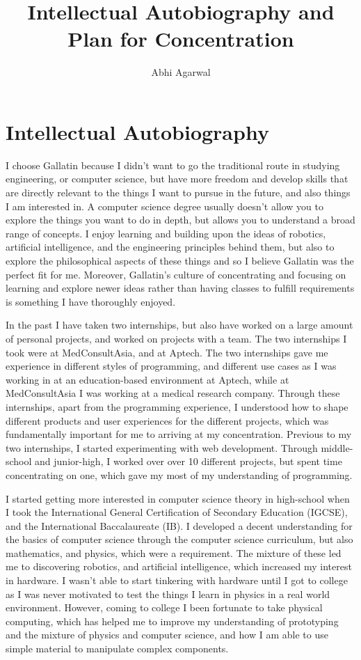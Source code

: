 \documentclass[11pt, oneside]{article}
\title{Intellectual Autobiography and Plan for Concentration}
\author{Abhi Agarwal}
\date{}
\begin{document}
\maketitle
\section{Intellectual Autobiography}

\par I choose Gallatin because I didn't want to go the traditional route in studying engineering, or computer science, but have more freedom and develop skills that are directly relevant to the things I want to pursue in the future, and also things I am interested in. A computer science degree usually doesn't allow you to explore the things you want to do in depth, but allows you to understand a broad range of concepts. I enjoy learning and building upon the ideas of robotics, artificial intelligence, and the engineering principles behind them, but also to explore the philosophical aspects of these things and so I believe Gallatin was the perfect fit for me. Moreover, Gallatin's culture of concentrating and focusing on learning and explore newer ideas rather than having classes to fulfill requirements is something I have thoroughly enjoyed.

\par In the past I have taken two internships, but also have worked on a large amount of personal projects, and worked on projects with a team. The two internships I took were at MedConsultAsia, and at Aptech. The two internships gave me experience in different styles of programming, and different use cases as I was working in at an education-based environment at Aptech, while at MedConsultAsia I was working at a medical research company. Through these internships, apart from the programming experience, I understood how to shape different products and user experiences for the different projects, which was fundamentally important for me to arriving at my concentration. Previous to my two internships, I started experimenting with web development. Through middle-school and junior-high, I worked over over 10 different projects, but spent time concentrating on one, which gave my most of my understanding of programming.

\par I started getting more interested in computer science theory in high-school when I took the International General Certification of Secondary Education (IGCSE), and the International Baccalaureate (IB). I developed a decent understanding for the basics of computer science through the computer science curriculum, but also mathematics, and physics, which were a requirement. The mixture of these led me to discovering robotics, and artificial intelligence, which increased my interest in hardware. I wasn't able to start tinkering with hardware until I got to college as I was never motivated to test the things I learn in physics in a real world environment. However, coming to college I been fortunate to take physical computing, which has helped me to improve my understanding of prototyping and the mixture of physics and computer science, and how I am able to use simple material to manipulate complex components.
\end{document}
